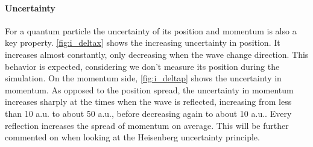 \paragraph{Uncertainty} For a quantum particle the uncertainty of its position and momentum is also a key property. \autoref{fig:i_deltax} shows the increasing uncertainty in position. It increases almost constantly, only decreasing when the wave change direction. This behavior is expected, considering we don't measure its position during the simulation. On the momentum side, \autoref{fig:i_deltap} shows the uncertainty in momentum. As opposed to the position spread, the uncertainty in momentum increases sharply at the times when the wave is reflected, increasing from less than 10 a.u. to about 50 a.u., before decreasing again to about 10 a.u.. Every reflection increases the spread of momentum on average. This will be further commented on when looking at the Heisenberg uncertainty principle.

